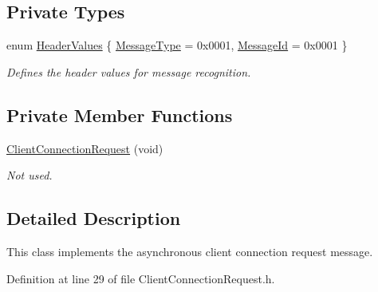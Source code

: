 \subsection*{Private Types}
\begin{DoxyCompactItemize}
\item 
enum \hyperlink{class_terra_swarm_1_1_asynchronous_1_1_client_connection_request_a5b974b64f68c96feb31f851ddb46c0f9}{Header\-Values} \{ \hyperlink{class_terra_swarm_1_1_asynchronous_1_1_client_connection_request_a5b974b64f68c96feb31f851ddb46c0f9af4ebdf9aec34ae059a020f367ea2b77d}{Message\-Type} = 0x0001, 
\hyperlink{class_terra_swarm_1_1_asynchronous_1_1_client_connection_request_a5b974b64f68c96feb31f851ddb46c0f9afc748027046d48c60438e276e3f820a6}{Message\-Id} = 0x0001
 \}
\begin{DoxyCompactList}\small\item\em Defines the header values for message recognition. \end{DoxyCompactList}\end{DoxyCompactItemize}
\subsection*{Private Member Functions}
\begin{DoxyCompactItemize}
\item 
\hyperlink{class_terra_swarm_1_1_asynchronous_1_1_client_connection_request_a4e8af695cc4e00a3da450f81fa2bc108}{Client\-Connection\-Request} (void)
\begin{DoxyCompactList}\small\item\em Not used. \end{DoxyCompactList}\end{DoxyCompactItemize}


\subsection{Detailed Description}
This class implements the asynchronous client connection request message. 

Definition at line 29 of file Client\-Connection\-Request.\-h.



